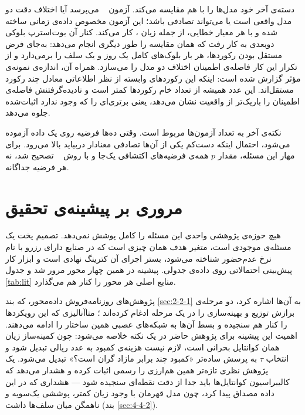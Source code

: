 دسته‌ی آخر خود مدل‌ها را با هم مقایسه می‌کند. آزمون
~\cite{DieboldMariano95} می‌پرسد آیا اختلاف دقت دو مدل واقعی است یا
می‌تواند تصادفی باشد؛ این آزمون مخصوص داده‌ی زمانی ساخته شده و با هر معیار خطایی، از جمله
زیان ، کار می‌کند. کنار آن بوت‌استرپ بلوکی دوبعدی به کار رفت که همان مقایسه را طور دیگری انجام می‌دهد: به‌جای فرض مستقل
بودن رکوردها، هر بار بلوک‌های کامل یک روز و یک سلف را برمی‌دارد و از تکرار این کار
فاصله‌ی اطمینان اختلاف دو مدل را می‌سازد. همراه آن، اندازه‌ی نمونه‌ی
مؤثر گزارش شده است: اینکه این رکوردهای وابسته از نظر
اطلاعاتی معادل چند رکورد مستقل‌اند. این عدد همیشه از تعداد خام رکوردها کمتر است و
نادیده‌گرفتنش فاصله‌ی اطمینان را باریک‌تر از واقعیت نشان می‌دهد، یعنی برتری‌ای را که وجود
ندارد اثبات‌شده جلوه می‌دهد.

نکته‌ی آخر به تعداد آزمون‌ها مربوط است. وقتی ده‌ها فرضیه روی یک داده آزموده می‌شود، احتمال
اینکه دست‌کم یکی از آن‌ها تصادفی معنادار دربیاید بالا می‌رود. برای مهار این مسئله، مقدار
$p$ همه‌ی فرضیه‌های اکتشافی یک‌جا و با روش
~\cite{BenjaminiHochberg95fdr} تصحیح شد، نه هر فرضیه جداگانه.


\section{مروری بر پیشینه‌ی تحقیق}
\label{sec:2-7}

هیچ حوزه‌ی پژوهشی واحدی این مسئله را کامل پوشش نمی‌دهد. تصمیم پخت یک مسئله‌ی موجودی
است، متغیر هدف همان چیزی است که در صنایع دارای رزرو با نام نرخ عدم‌حضور شناخته می‌شود،
بستر اجرای آن کترینگ نهادی است و ابزار کار پیش‌بینی احتمالاتی روی داده‌ی جدولی. پیشینه در
همین چهار محور مرور شد و جدول \ref{tab:lit} منابع اصلی هر محور را کنار هم می‌گذارد.

پژوهش‌های روزنامه‌فروش داده‌محور، که بند \ref{sec:2-2-1} به آن‌ها اشاره کرد، دو مرحله‌ی
برازش توزیع و بهینه‌سازی را در یک مرحله ادغام کرده‌اند
\cite{BanRudin19bigdata,Huber19datadecision}؛ متاآنالیزی که این رویکردها را کنار هم
سنجیده \cite{Buttler22meta} و بسط آن‌ها به شبکه‌های عصبی
\cite{Oroojlooyjadid20deepnv} همین ساختار را ادامه می‌دهند. اهمیت این پیشینه برای
پژوهش حاضر در یک نکته خلاصه می‌شود: چون کمینه‌ساز زیان  همان کوانتایل
بحرانی است، لازم نیست هزینه‌ی کمبود به عدد ریالی تبدیل شود و انتخاب $\tau$ به پرسش
ساده‌تر «کمبود چند برابر مازاد گران است؟» تبدیل می‌شود. یک پژوهش نظری تازه‌تر همین هم‌ارزی را رسمی اثبات کرده و
هشدار می‌دهد که کالیبراسیون کوانتایل‌ها باید جدا از دقت نقطه‌ای سنجیده شود
\cite{Risks26coherent} — هشداری که در این داده مصداق پیدا کرد، چون مدل قهرمان با وجود
زیان کمتر، پوششی یک‌سویه و ناهمگن میان سلف‌ها داشت (بند \ref{sec:4-4-2}).

